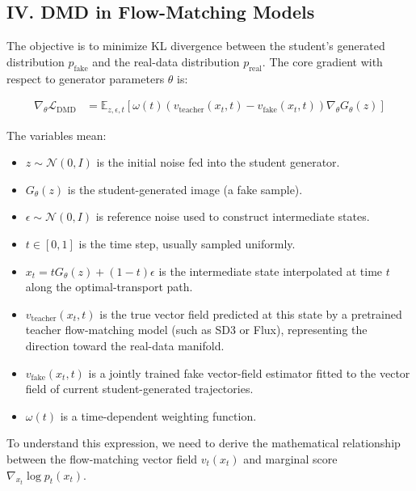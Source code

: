 \hypertarget{iv.-dmd-in-flow-matching-models}{%
\subsection{IV. DMD in Flow-Matching Models}\label{iv.-dmd-in-flow-matching-models}}

The objective is to minimize KL divergence between the student's generated distribution \(p_{\mathrm{fake}}\) and the real-data distribution \(p_{\mathrm{real}}\). The core gradient with respect to generator parameters \(\theta\) is:

\[
\begin{aligned}
\nabla_\theta\mathcal{L}_{\mathrm{DMD}}
&=
\mathbb{E}_{z,\epsilon,t}\left[
\omega(t)
\left(v_{\mathrm{teacher}}(x_t,t)-v_{\mathrm{fake}}(x_t,t)\right)
\nabla_\theta G_\theta(z)
\right]
\end{aligned}
\]

The variables mean:

\begin{itemize}
\tightlist
\item
  \(z\sim\mathcal{N}(0,I)\) is the initial noise fed into the student generator.
\item
  \(G_\theta(z)\) is the student-generated image (a fake sample).
\item
  \(\epsilon\sim\mathcal{N}(0,I)\) is reference noise used to construct intermediate states.
\item
  \(t\in[0,1]\) is the time step, usually sampled uniformly.
\item
  \(x_t=tG_\theta(z)+(1-t)\epsilon\) is the intermediate state interpolated at time \(t\) along the optimal-transport path.
\item
  \(v_{\mathrm{teacher}}(x_t,t)\) is the true vector field predicted at this state by a pretrained teacher flow-matching model (such as SD3 or Flux), representing the direction toward the real-data manifold.
\item
  \(v_{\mathrm{fake}}(x_t,t)\) is a jointly trained fake vector-field estimator fitted to the vector field of current student-generated trajectories.
\item
  \(\omega(t)\) is a time-dependent weighting function.
\end{itemize}

To understand this expression, we need to derive the mathematical relationship between the flow-matching vector field \(v_t(x_t)\) and marginal score \(\nabla_{x_t}\log p_t(x_t)\).

